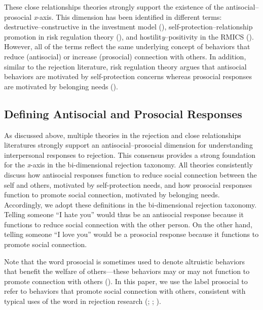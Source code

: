 \documentclass[
]{udthesis}
\begin{document}
These close relationships theories strongly support the existence of the
antisocial--prosocial \emph{x}-axis. This dimension has been identified in
different terms: destructive--constructive in the investment model
(), self-protection--relationship promotion in risk
regulation theory (), and hostilit\emph{y}--positivity in the
RMICS (). However, all of the terms reflect the same
underlying concept of behaviors that reduce (antisocial) or increase
(prosocial) connection with others. In addition, similar to the
rejection literature, risk regulation theory argues that antisocial
behaviors are motivated by self-protection concerns whereas prosocial
responses are motivated by belonging needs ().

\subsection{Defining Antisocial and Prosocial Responses}\label{defining-antisocial-and-prosocial-responses}

As discussed above, multiple theories in the rejection and close
relationships literatures strongly support an antisocial--prosocial
dimension for understanding interpersonal responses to rejection. This
consensus provides a strong foundation for the \emph{x}-axis in the
bi-dimensional rejection taxonomy. All theories consistently discuss how
antisocial responses function to reduce social connection between the
self and others, motivated by self-protection needs, and how prosocial
responses function to promote social connection, motivated by belonging
needs. Accordingly, we adopt these definitions in the bi-dimensional
rejection taxonomy. Telling someone ``I hate you'' would thus be an
antisocial response because it functions to reduce social connection
with the other person. On the other hand, telling someone ``I love you''
would be a prosocial response because it functions to promote social
connection.

Note that the word prosocial is sometimes used to denote altruistic
behaviors that benefit the welfare of others---these behaviors may or
may not function to promote connection with others
(). In this paper, we use the label
prosocial to refer to behaviors that promote social connection with
others, consistent with typical uses of the word in rejection research
(; ; ).
\end{document}
